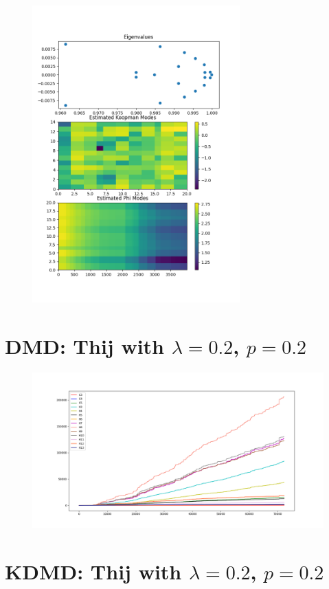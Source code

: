 \begin{figure}
    \includegraphics[width=8cm]{Images/KDMDm2k300eigen.png}
    \centering
\end{figure}

\FloatBarrier
\section{DMD: Thij with $\lambda=0.2$, $p=0.2$}
\begin{figure}
    \includegraphics[width=12cm]{Images/twitter_counts_020209.png}
    \centering
\end{figure}


\section{KDMD: Thij with $\lambda=0.2$, $p=0.2$}

